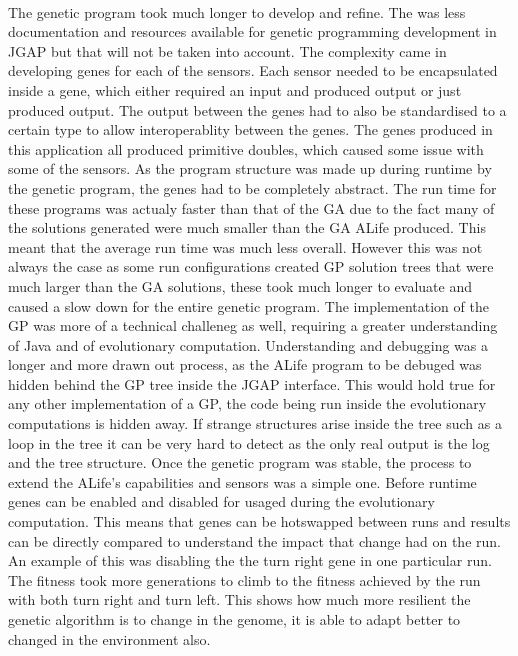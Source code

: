 \documentclass[12pt]{article}
\begin{document}
\paragraph{}
The genetic program took much longer to develop and refine. The was less documentation and resources available for genetic programming 
development in JGAP but that will not be taken into account. The complexity came in developing genes for each of the sensors. Each sensor
needed to be encapsulated inside a gene, which either required an input and produced output or just produced output. The output between
the genes had to also be standardised to a certain type to allow interoperablity between the genes. The genes produced in this application
all produced primitive doubles, which caused some issue with some of the sensors. As the program structure was made up during runtime by
the genetic program, the genes had to be completely abstract. The run time for these programs was actualy faster than that of the GA due
to the fact many of the solutions generated were much smaller than the GA ALife produced. This meant that the average run time was much 
less overall. However this was not always the case as some run configurations created GP solution trees that were much larger than the 
GA solutions, these took much longer to evaluate and caused a slow down for the entire genetic program. The implementation of the GP was 
more of a technical challeneg as well, requiring a greater understanding of Java and of evolutionary computation. Understanding and debugging
was a longer and more drawn out process, as the ALife program to be debuged was hidden behind the GP tree inside the JGAP interface.
This would hold true for any other implementation of a GP, the code being run inside the evolutionary computations is hidden away. If strange
structures arise inside the tree such as a loop in the tree it can be very hard to detect as the only real output is the log and
the tree structure. Once the genetic program was stable, the process to extend the ALife's capabilities and sensors was a simple one. Before
runtime genes can be enabled and disabled for usaged during the evolutionary computation. This means that genes can be hotswapped between
runs and results can be directly compared to understand the impact that change had on the run. An example of this was disabling the the turn
right gene in one particular run. The fitness took more generations to climb to the fitness achieved by the run with both turn right and
turn left. This shows how much more resilient the genetic algorithm is to change in the genome, it is able to adapt better to changed in
the environment also.
\end{document}
